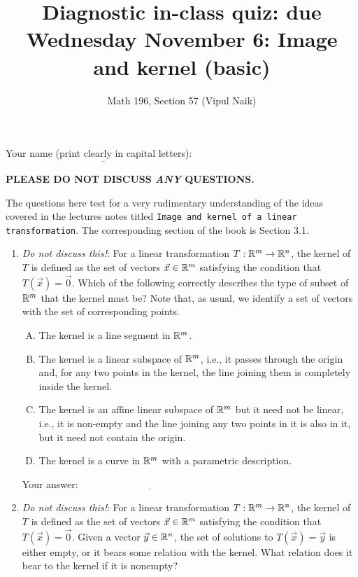 \documentclass[10pt]{amsart}
\title{Diagnostic in-class quiz: due Wednesday November 6: Image and kernel (basic)}
\author{Math 196, Section 57 (Vipul Naik)}
\begin{document}
\maketitle

Your name (print clearly in capital letters): $\underline{\qquad\qquad\qquad\qquad\qquad\qquad\qquad\qquad\qquad\qquad}$

{\bf PLEASE DO NOT DISCUSS {\em ANY} QUESTIONS.}

The questions here test for a very rudimentary understanding of the
ideas covered in the lectures notes titled {\tt Image and kernel of a
  linear transformation}. The corresponding section of the book is
Section 3.1.

\begin{enumerate}

\item {\em Do not discuss this!}: For a linear transformation $T: \mathbb{R}^m
  \to \mathbb{R}^n$, the kernel of $T$ is defined as the set of vectors
  $\vec{x} \in \mathbb{R}^m$ satisfying the condition that $T(\vec{x}) =
  \vec{0}$. Which of the following correctly describes the type of
  subset of $\mathbb{R}^m$ that the kernel must be? Note that, as usual, we
  identify a set of vectors with the set of corresponding points.

  \begin{enumerate}[(A)]
  \item The kernel is a line segment in $\mathbb{R}^m$.
  \item The kernel is a linear subspace of $\mathbb{R}^m$, i.e., it passes
    through the origin and, for any two points in the kernel, the line
    joining them is completely inside the kernel.
  \item The kernel is an affine linear subspace of $\mathbb{R}^m$ but it need
    not be linear, i.e., it is non-empty and the line joining any two
    points in it is also in it, but it need not contain the origin.
  \item The kernel is a curve in $\mathbb{R}^m$ with a parametric description.
  \end{enumerate}

  \vspace{0.1in}
  Your answer: $\underline{\qquad\qquad\qquad\qquad\qquad\qquad\qquad}$
  \vspace{0.1in}

\item {\em Do not discuss this!}: For a linear transformation $T: \mathbb{R}^m
  \to \mathbb{R}^n$, the kernel of $T$ is defined as the set of vectors
  $\vec{x} \in \mathbb{R}^m$ satisfying the condition that $T(\vec{x}) =
  \vec{0}$. Given a vector $\vec{y} \in \mathbb{R}^n$, the set of solutions to
  $T(\vec{x}) = \vec{y}$ is either empty, or it bears some relation
  with the kernel. What relation does it bear to the kernel if it is
  nonempty?


\end{enumerate}
\end{document}
